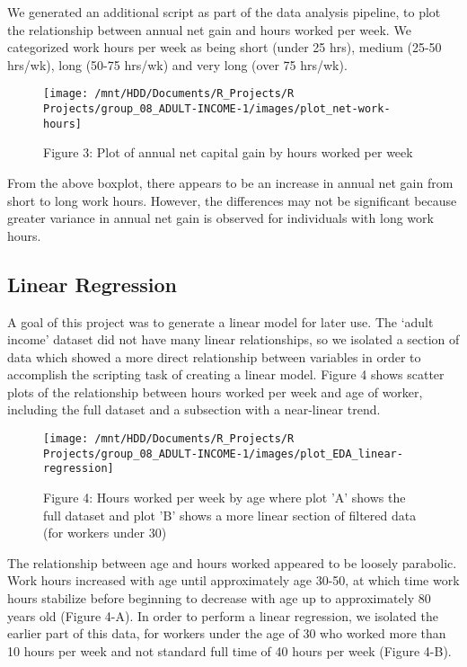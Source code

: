 \documentclass[]{article}
\begin{document}
We generated an additional script as part of the data analysis pipeline,
to plot the relationship between annual net gain and hours worked per
week. We categorized work hours per week as being short (under 25 hrs),
medium (25-50 hrs/wk), long (50-75 hrs/wk) and very long (over 75
hrs/wk).

\begin{figure}

{\centering \texttt{[image: /mnt/HDD/Documents/R\_Projects/R Projects/group\_08\_ADULT-INCOME-1/images/plot\_net-work-hours]} 

}

\caption{Figure 3: Plot of annual net capital gain by hours worked per week}\label{fig:work-hours-plot}
\end{figure}

From the above boxplot, there appears to be an increase in annual net
gain from short to long work hours. However, the differences may not be
significant because greater variance in annual net gain is observed for
individuals with long work hours.

\hypertarget{linear-regression}{%
\subsection{Linear Regression}\label{linear-regression}}

A goal of this project was to generate a linear model for later use. The
`adult income' dataset did not have many linear relationships, so we
isolated a section of data which showed a more direct relationship
between variables in order to accomplish the scripting task of creating
a linear model. Figure 4 shows scatter plots of the relationship between
hours worked per week and age of worker, including the full dataset and
a subsection with a near-linear trend.

\begin{figure}

{\centering \texttt{[image: /mnt/HDD/Documents/R\_Projects/R Projects/group\_08\_ADULT-INCOME-1/images/plot\_EDA\_linear-regression]} 

}

\caption{Figure 4: Hours worked per week by age where plot 'A' shows the full dataset and plot 'B' shows a more linear section of filtered data (for workers under 30)}\label{fig:EDA-linear-plot}
\end{figure}

The relationship between age and hours worked appeared to be loosely
parabolic. Work hours increased with age until approximately age 30-50,
at which time work hours stabilize before beginning to decrease with age
up to approximately 80 years old (Figure 4-A). In order to perform a
linear regression, we isolated the earlier part of this data, for
workers under the age of 30 who worked more than 10 hours per week and
not standard full time of 40 hours per week (Figure 4-B).
\end{document}
